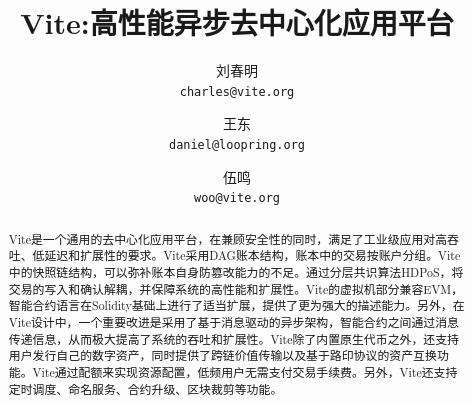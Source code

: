 \documentclass[UTF8,nofonts]{ctexart}
\title{\textbf{Vite:}\textbf{高性能异步去中心化应用平台}}
\author{
  刘春明\\
  \texttt{charles@vite.org}\\
  \and
  王东\\
  \texttt{daniel@loopring.org}\\
  \and
  伍鸣\\
  \texttt{woo@vite.org}\\
 }
\date{}
\begin{document}
\maketitle

\begin{abstract}
Vite是一个通用的去中心化应用平台，在兼顾安全性的同时，满足了工业级应用对高吞吐、低延迟和扩展性的要求。Vite采用DAG账本结构，账本中的交易按账户分组。Vite中的快照链结构，可以弥补账本自身防篡改能力的不足。通过分层共识算法HDPoS，将交易的写入和确认解耦，并保障系统的高性能和扩展性。Vite的虚拟机部分兼容EVM，智能合约语言在Solidity基础上进行了适当扩展，提供了更为强大的描述能力。另外，在Vite设计中，一个重要改进是采用了基于消息驱动的异步架构，智能合约之间通过消息传递信息，从而极大提高了系统的吞吐和扩展性。Vite除了内置原生代币之外，还支持用户发行自己的数字资产，同时提供了跨链价值传输以及基于路印协议\cite{loopring}的资产互换功能。Vite通过配额来实现资源配置，低频用户无需支付交易手续费。另外，Vite还支持定时调度、命名服务、合约升级、区块裁剪等功能。
\end{abstract}
\end{document}
